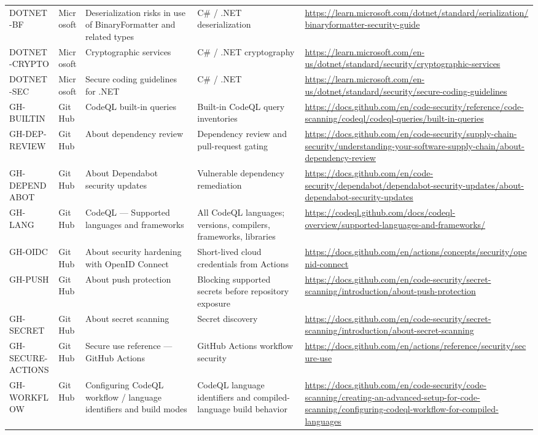 \documentclass[10pt,letterpaper]{article}
\begin{document}
\begin{landscape}
\begin{longtable}{@{}P{0.82in}P{1.23in}P{2.25in}P{1.7in}P{3.0in}@{}}
DOTNET-BF & Microsoft & Deserialization risks in use of BinaryFormatter and related types & C\# / .NET deserialization & \url{https://learn.microsoft.com/dotnet/standard/serialization/binaryformatter-security-guide}\\
DOTNET-CRYPTO & Microsoft & Cryptographic services & C\# / .NET cryptography & \url{https://learn.microsoft.com/en-us/dotnet/standard/security/cryptographic-services}\\
DOTNET-SEC & Microsoft & Secure coding guidelines for .NET & C\# / .NET & \url{https://learn.microsoft.com/en-us/dotnet/standard/security/secure-coding-guidelines}\\
GH-BUILTIN & GitHub & CodeQL built-in queries & Built-in CodeQL query inventories & \url{https://docs.github.com/en/code-security/reference/code-scanning/codeql/codeql-queries/built-in-queries}\\
GH-DEP-REVIEW & GitHub & About dependency review & Dependency review and pull-request gating & \url{https://docs.github.com/en/code-security/supply-chain-security/understanding-your-software-supply-chain/about-dependency-review}\\
GH-DEPENDABOT & GitHub & About Dependabot security updates & Vulnerable dependency remediation & \url{https://docs.github.com/en/code-security/dependabot/dependabot-security-updates/about-dependabot-security-updates}\\
GH-LANG & GitHub & CodeQL --- Supported languages and frameworks & All CodeQL languages; versions, compilers, frameworks, libraries & \url{https://codeql.github.com/docs/codeql-overview/supported-languages-and-frameworks/}\\
GH-OIDC & GitHub & About security hardening with OpenID Connect & Short-lived cloud credentials from Actions & \url{https://docs.github.com/en/actions/concepts/security/openid-connect}\\
GH-PUSH & GitHub & About push protection & Blocking supported secrets before repository exposure & \url{https://docs.github.com/en/code-security/secret-scanning/introduction/about-push-protection}\\
GH-SECRET & GitHub & About secret scanning & Secret discovery & \url{https://docs.github.com/en/code-security/secret-scanning/introduction/about-secret-scanning}\\
GH-SECURE-ACTIONS & GitHub & Secure use reference --- GitHub Actions & GitHub Actions workflow security & \url{https://docs.github.com/en/actions/reference/security/secure-use}\\
GH-WORKFLOW & GitHub & Configuring CodeQL workflow / language identifiers and build modes & CodeQL language identifiers and compiled-language build behavior & \url{https://docs.github.com/en/code-security/code-scanning/creating-an-advanced-setup-for-code-scanning/configuring-codeql-workflow-for-compiled-languages}\\

\end{longtable}
\end{landscape}
\end{document}
